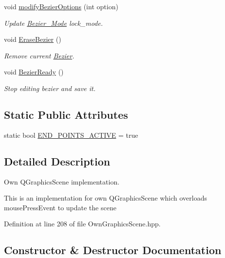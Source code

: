 \begin{DoxyCompactItemize}
void \mbox{\hyperlink{classOwnGraphicsScene_a302a5f437c44f6fc84f9911e41172734}{modify\+Bezier\+Options}} (int option)
\begin{DoxyCompactList}\small\item\em Update \mbox{\hyperlink{structBezier__Mode}{Bezier\+\_\+\+Mode}} lock\+\_\+mode. \end{DoxyCompactList}\item 
void \mbox{\hyperlink{classOwnGraphicsScene_a7b205ba3c4db5e88f60f1f327175b5b6}{Erase\+Bezier}} ()
\begin{DoxyCompactList}\small\item\em Remove current \mbox{\hyperlink{classBezier}{Bezier}}. \end{DoxyCompactList}\item 
void \mbox{\hyperlink{classOwnGraphicsScene_a0417f4637137fc3ef7004a7b6eeb6a39}{Bezier\+Ready}} ()
\begin{DoxyCompactList}\small\item\em Stop editing bezier and save it. \end{DoxyCompactList}\end{DoxyCompactItemize}
\subsection*{Static Public Attributes}
\begin{DoxyCompactItemize}
\item 
static bool \mbox{\hyperlink{classOwnGraphicsScene_a511dd73ffc0a5f3ee28e8950d0636f5e}{E\+N\+D\+\_\+\+P\+O\+I\+N\+T\+S\+\_\+\+A\+C\+T\+I\+VE}} = true
\end{DoxyCompactItemize}


\subsection{Detailed Description}
Own Q\+Graphics\+Scene implementation. 

This is an implementation for own Q\+Graphics\+Scene which overloads mouse\+Press\+Event to update the scene 

Definition at line 208 of file Own\+Graphics\+Scene.\+hpp.



\subsection{Constructor \& Destructor Documentation}
\mbox{\label{classOwnGraphicsScene_a242b82147a469314e4c7fb5af69c265f}} 
